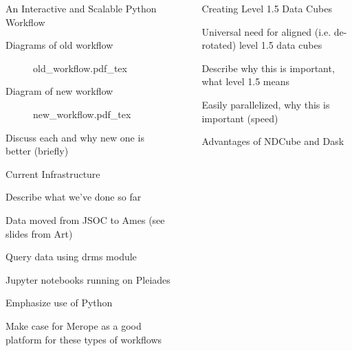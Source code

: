 \documentclass[final,12pt]{beamer}
\newlength{\sepwidth}
\newlength{\colwidth}
\newcommand{\separatorcolumn}{\begin{column}{\sepwidth}\end{column}}
\begin{document}
\begin{frame}[fragile,t]
\begin{columns}[t]
\begin{column}{\colwidth}
  \begin{block}{An Interactive and Scalable Python Workflow}

    Diagrams of old workflow

    \begin{figure}
      \centering
      \def\svgwidth{0.7\columnwidth}
      {old_workflow.pdf_tex}
    \end{figure}

    Diagram of new workflow

    \begin{figure}
      \centering
      \def\svgwidth{0.8\columnwidth}
      {new_workflow.pdf_tex}
    \end{figure}

    Discuss each and why new one is better (briefly)


  \end{block}

  \begin{block}{Current Infrastructure}

    Describe what we've done so far

    Data moved from JSOC to Ames (see slides from Art)

    Query data using drms module \citet{glogowski_drms_2019}

    Jupyter notebooks running on Pleiades

    Emphasize use of Python

    Make case for Merope as a good platform for these types of workflows

  \end{block}

\end{column}

\separatorcolumn

\begin{column}{\colwidth}

  \begin{block}{Creating Level 1.5 Data Cubes}

    Universal need for aligned (i.e. de-rotated) level 1.5 data cubes

    Describe why this is important, what level 1.5 means

    Easily parallelized, why this is important (speed)

    Advantages of NDCube and Dask


\end{block}
\end{column}
\end{columns}
\end{frame}
\end{document}
